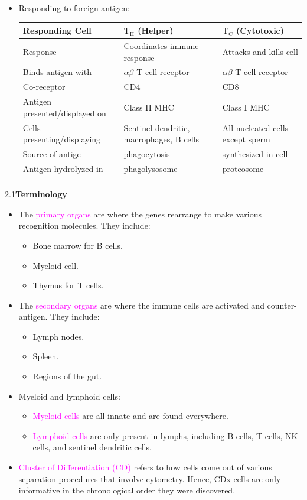 \documentclass[UTF8]{book}
\newcommand{\et}{&}
\newcommand{\concept}[1]{\textcolor{magenta}{#1}}
\begin{document}
\begin{itemize}
\item Responding to foreign antigen:
\begin{center}
\begin{tabular}{|m{5.5cm}<{\centering}|m{4cm}<{\centering}|m{4cm}<{\centering}|} \Xhline{1.2pt}
Responding Cell \et $\mathrm{T_H}$ (Helper) \et $\mathrm{T_C}$ (Cytotoxic) \\ \hline
Response \et Coordinates immune response \et Attacks and kills cell\\ \hline
Binds antigen with \et $\alpha\beta$ T-cell receptor \et $\alpha\beta$ T-cell receptor\\ \hline
Co-receptor \et CD4 \et CD8\\ \hline
Antigen presented/displayed on \et Class II MHC \et Class I MHC\\ \hline
Cells presenting/displaying \et Sentinel dendritic, macrophages, B cells\et All nucleated cells except sperm\\ \hline
Source of antige \et phagocytosis \et synthesized in cell\\ \hline
Antigen hydrolyzed in \et phagolysosome \et proteosome\\ \Xhline{1.2pt}
\end{tabular}
\end{center}
\end{itemize}
2.1\quad \textbf{Terminology}
\begin{itemize}
\item The \concept{primary organs} are where the genes rearrange to make various recognition molecules. They include:
\begin{itemize}
	\item Bone marrow for B cells.
	\item Myeloid cell.
	\item Thymus for T cells. 
\end{itemize}
\item The \concept{secondary organs} are where the immune cells are activated and counter-antigen. They include:
\begin{itemize}
	\item Lymph nodes.
	\item Spleen.
	\item Regions of the gut.
\end{itemize}
\item Myeloid and lymphoid cells:
\begin{itemize}
	\item \concept{Myeloid cells} are all innate and are found everywhere.
	\item \concept{Lymphoid cells} are only present in lymphs, including B cells, T cells, NK cells, and sentinel dendritic cells.
\end{itemize}
\item \concept{Cluster of Differentiation (CD)} refers to how cells come out of various separation procedures that involve cytometry. Hence, CDx cells are only informative in the chronological order they were discovered.
\end{itemize}
\end{document}
